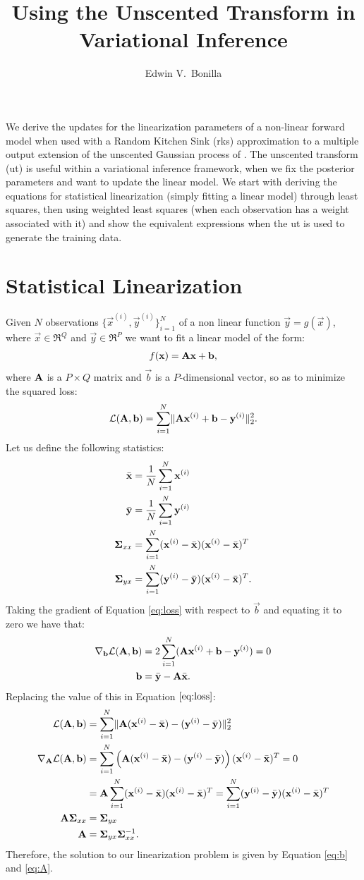 \documentclass[11pt,a4paper]{article}
\title{Using the Unscented Transform in Variational Inference}
\author{Edwin V.~Bonilla}
\newcommand{\ut}{{\sc ut}\xspace}
\newcommand{\x}{\vec{x}}
\newcommand{\y}{\vec{y}}
\renewcommand{\xi}{\x^{(i)}}
\newcommand{\yi}{\y^{(i)}}
\renewcommand{\b}{\vec{b}}
\newcommand{\xbar}{\bar{\x}}
\newcommand{\ybar}{\bar{\y}}
\newcommand{\Sigmaxx}{\mat{\Sigma}_{xx}}
\newcommand{\Sigmayx}{\mat{\Sigma}_{yx}}
\newcommand{\grad}{\nabla}
\newcommand{\loss}{\calL(\A,\b)}
\renewcommand{\Q}{Q}
\renewcommand{\P}{P}
\newcommand{\rks}{{\sc rks}}
\begin{document}
\maketitle
We derive the updates for the linearization parameters of a non-linear forward model
when used with a Random Kitchen Sink (\rks) approximation to a multiple output
extension of the unscented Gaussian process of . 
The unscented transform (\ut) is useful within a variational inference framework,
when we fix the posterior parameters and want to update the linear model. 
%
We start with deriving the equations for statistical linearization (simply fitting a linear model) 
through least squares, then using weighted least squares (when each observation has a 
weight associated with it) and show the equivalent expressions when the \ut
is used to generate the training data.

\section{Statistical Linearization}
Given $N$ observations $\{ \xi, \yi\}_{i=1}^N$ of a non linear function $\y = g(\x)$, where 
$\x \in \Re^\Q$ and $\y \in \Re^\P$ we want to fit a linear model of the form:
\begin{align}
	f(\x) = \A \x + \b \text{,}
\end{align}
where $\mathbf{A}$ is a $\P \times  \Q$ matrix and $\b$ is a $\P$-dimensional vector, so as to 
minimize the squared loss:
\begin{align}
	\label{eq:loss}
	\loss = \sum_{i=1}^N \norm{\A \xi + \b - \yi }_2^2 \text{.}
\end{align}
Let us define the following statistics:
\begin{align}
	\xbar & = \frac{1}{N} \sum_{i=1}^N \xi \\
	\ybar & = \frac{1}{N} \sum_{i=1}^N \yi \\
	\Sigmaxx & = \sum_{i=1}^N (\xi - \xbar) (\xi - \xbar)^T \\
	\Sigmayx & = \sum_{i=1}^N (\yi - \ybar) (\xi - \xbar)^T \text{.}
\end{align}
Taking the gradient of Equation \eqref{eq:loss} with respect to $\b$  and equating it to zero we have that:
\begin{align}
	\grad_{\b} \loss &= 2 \sum_{i=1}^N ( \A \xi + \b - \yi )   = 0 \\
	\label{eq:b}
		\b & = \ybar - \A \xbar \text{.}
\end{align}
Replacing the value of this in Equation $\eqref{eq:loss}$:
\begin{align}
	\loss &= \sum_{i=1}^N \norm{\A (\xi  -\xbar) -  (\yi - \ybar) }_2^2 \\
	\grad_{\A} \loss & =\sum_{i=1}^N \left(\A (\xi  -\xbar) -  (\yi - \ybar) \right) (\xi  -\xbar)^T = 0 \\	
	& = \A \sum_{i=1}^N (\xi  -\xbar)  (\xi  -\xbar)^T = \sum_{i=1}^N (\yi - \ybar)  (\xi  -\xbar)^T \\
	\A \Sigmaxx & = \Sigmayx \\
		\label{eq:A}
	\A & =  \Sigmayx  \Sigmaxx^{-1} \text{.}
\end{align}
Therefore, the solution to our linearization problem is given by Equation \eqref{eq:b} and
\eqref{eq:A}. 
\end{document}
